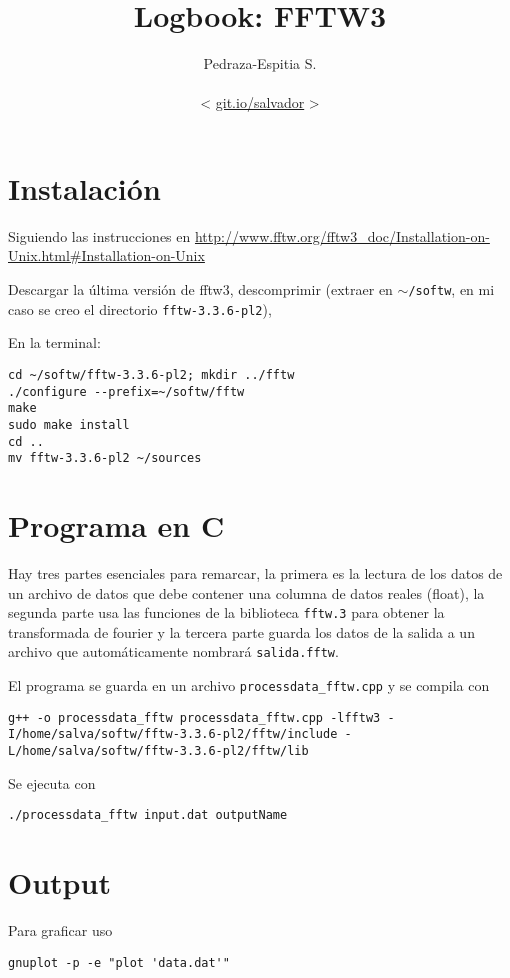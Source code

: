 \documentclass[letterpaper,11pt]{article}
\title{Logbook:  FFTW3}
\author{Pedraza-Espitia S.\\ \\< \url{git.io/salvador} >}
\date{}
\begin{document}
\maketitle
{}

%
%
\section{Instalación}
Siguiendo las instrucciones en \url{http://www.fftw.org/fftw3_doc/Installation-on-Unix.html#Installation-on-Unix}

Descargar la última versión de fftw3, descomprimir (extraer en $\sim$\verb|/softw|, en mi caso se creo el directorio \verb|fftw-3.3.6-pl2|), 

En la terminal:
\begin{lstlisting}
cd ~/softw/fftw-3.3.6-pl2; mkdir ../fftw
./configure --prefix=~/softw/fftw
make
sudo make install
cd ..
mv fftw-3.3.6-pl2 ~/sources
\end{lstlisting}

\section{Programa en C}
Hay tres partes esenciales para remarcar, la primera es la lectura de los datos de un archivo de datos que debe contener una columna de datos reales (float), la segunda parte usa las funciones de la biblioteca \verb|fftw.3| para obtener la transformada de fourier y la tercera parte guarda los datos de la salida a un archivo que automáticamente nombrará \verb|salida.fftw|.


El programa se guarda en un archivo \verb|processdata_fftw.cpp| y se compila con\\
\begin{lstlisting}
g++ -o processdata_fftw processdata_fftw.cpp -lfftw3 -I/home/salva/softw/fftw-3.3.6-pl2/fftw/include -L/home/salva/softw/fftw-3.3.6-pl2/fftw/lib
\end{lstlisting}

Se ejecuta con
\begin{lstlisting}
./processdata_fftw input.dat outputName
\end{lstlisting}
\section{Output}
\label{sec:output}
Para graficar uso
\begin{lstlisting}
gnuplot -p -e "plot 'data.dat'"
\end{lstlisting}
\FloatBarrier
\end{document}
